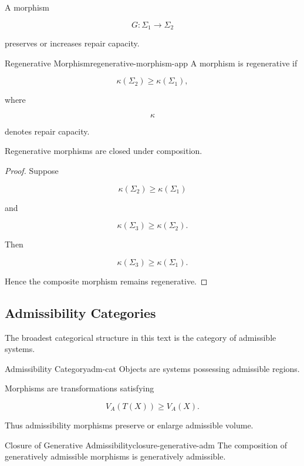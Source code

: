 \documentclass[12pt,twoside,openright]{book}
\newenvironment{prop}
{\begin{proposition}{}{}}
{\end{proposition}}
\begin{document}
A morphism

\[
G:\Sigma_1\rightarrow\Sigma_2
\]

preserves or increases repair capacity.

\begin{definition}{Regenerative Morphism}{regenerative-morphism-app}
A morphism is regenerative if

\[
\kappa(\Sigma_2)
\ge
\kappa(\Sigma_1),
\]

where

\[
\kappa
\]

denotes repair capacity.
\end{definition}

\begin{prop}
Regenerative morphisms are closed under composition.
\end{prop}

\begin{proof}
Suppose

\[
\kappa(\Sigma_2)
\ge
\kappa(\Sigma_1)
\]

and

\[
\kappa(\Sigma_3)
\ge
\kappa(\Sigma_2).
\]

Then

\[
\kappa(\Sigma_3)
\ge
\kappa(\Sigma_1).
\]

Hence the composite morphism remains regenerative.
\end{proof}

\subsection{Admissibility Categories}

The broadest categorical structure in this text is the
category of admissible systems.

\begin{definition}{Admissibility Category}{adm-cat}
Objects are systems possessing admissible regions.

Morphisms are transformations satisfying

\[
V_A(T(X))
\ge
V_A(X).
\]
\end{definition}

Thus admissibility morphisms preserve or enlarge
admissible volume.

\begin{theorem}{Closure of Generative Admissibility}{closure-generative-adm}
The composition of generatively admissible morphisms is
generatively admissible.
\end{theorem}
\end{document}
